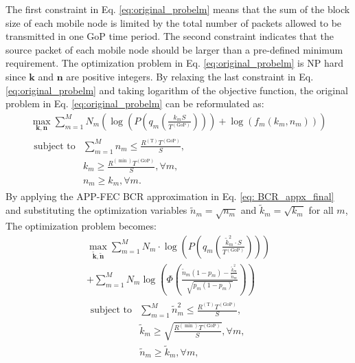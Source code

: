\documentclass[journal]{IEEEtran}
\begin{document}
The first constraint in Eq. \eqref{eq:original_probelm} means that the sum of the block size of each mobile node is limited by the total number of packets allowed to be transmitted in one GoP time period. The second constraint indicates that the source packet of each mobile node should be larger than a pre-defined minimum requirement. The optimization problem in Eq. \eqref{eq:original_probelm} is NP hard since $\mathbf{k}$ and $\mathbf{n}$ are positive integers. By relaxing the last constraint in Eq. \eqref{eq:original_probelm} and taking logarithm of the objective function, the original problem in Eq. \eqref{eq:original_probelm} can be reformulated as:
\begin{equation}
\begin{array}{l}
\!\!\max_{\mathbf{k,n}}\!\!\sum_{m=1}^{M} \!\!N_m\!\!\left(\!\! \log\!\left(\!\!P\left(\!\!q_m\left(\frac{k_m S}{T^{\left(\text{GoP}\right)}}\!\!\right)\!\!\right)\!\!\right)\!\!+\!\!\log\left(f_m\left(k_m,\!n_m\!\right)\!\right)\!\!\right)\\
\begin{array}{ll}
\text{subject to}&\sum_{m=1}^{M}n_m\leq\frac{R^{\left(\text{T}\right)}T^{\left(\text{GoP}\right)}}{S},\\
& k_m \geq \frac{R^{\left(\min\right)}T^{\left(\text{GoP}\right)}}{S}, \forall m,\\
& n_m \geq k_m, \forall m.
\end{array}
\end{array}
\end{equation}
By applying the APP-FEC BCR approximation in Eq. \eqref{eq: BCR_appx_final} and substituting the optimization variables $\tilde{n}_m=\sqrt{n_m}$ and $\tilde{k}_m=\sqrt{k_m}$ for all $m$, The optimization problem becomes:
\begin{equation}\label{eq:finalProblem}
\begin{array}{l}
\max_{\mathbf{\tilde{k},\tilde{n}}}\sum_{m=1}^{M}N_m\cdot \log\left(P\left(q_m\left(\frac{\tilde{k}^2_m\cdot S}{T^{\left(\text{GoP}\right)}}\right)\right)\right)\\
+\sum_{m=1}^{M}N_m\log\left(\Phi\left(\frac{\tilde{n}_m\left(1-p_m\right)-\frac{\tilde{k}_m^2}{\tilde{n}_m}}{\sqrt{p_m\left(1-p_m\right)}}\right)\right)\\
\begin{array}{ll}
\text{subject to}&\sum_{m=1}^{M}\tilde{n}_m^2\leq\frac{R^{\left(\text{T}\right)}T^{\left(\text{GoP}\right)}}{S},\\
& \tilde{k}_m \geq \sqrt{\frac{R^{\left(\min\right)}T^{\left(\text{GoP}\right)}}{S}}, \forall m,\\
& \tilde{n}_m \geq \tilde{k}_m, \forall m,
\end{array}
\end{array}
\end{equation}
\end{document}
